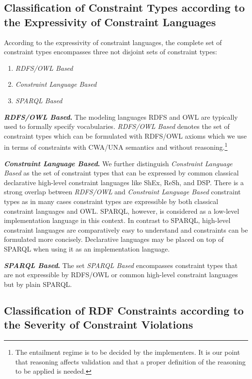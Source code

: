 \documentclass{llncs}
\begin{document}
\subsection{Classification of Constraint Types according to the Expressivity of Constraint Languages}

According to the expressivity of constraint languages, the complete set of constraint types encompasses three not disjoint sets of constraint types:
\begin{enumerate}
	\item \emph{RDFS/OWL Based}
	\item \emph{Constraint Language Based}
	\item \emph{SPARQL Based}
\end{enumerate}

\textbf{\emph{RDFS/OWL Based}.}
The modeling languages RDFS and OWL are typically used to formally specify vocabularies. \emph{RDFS/OWL Based} denotes the set of constraint types which can be formulated with RDFS/OWL axioms which we use in terms of constraints with CWA/UNA semantics and without reasoning.\footnote{The entailment regime is to be decided by the implementers. It is our point that reasoning affects validation and that a proper definition of the reasoning to be applied is needed.} 

\textbf{\emph{Constraint Language Based}.}
We further distinguish \emph{Constraint Language Based} as the set of constraint types that can be expressed by common classical declarative high-level constraint languages like ShEx, ReSh, and DSP. 
There is a strong overlap between \emph{RDFS/OWL} and \emph{Constraint Language Based} constraint types as in many cases constraint types are expressible by both classical constraint languages and OWL. SPARQL, however, is considered as a low-level implementation language in this context. In contrast to SPARQL, high-level constraint languages are comparatively easy to understand and constraints can be formulated more concisely. Declarative languages may be placed on top of SPARQL when using it as an implementation language. 

\textbf{\emph{SPARQL Based}.}
The set \emph{SPARQL Based} encompasses constraint types that are not expressible by RDFS/OWL or common high-level constraint languages but by plain SPARQL. 

\subsection{Classification of RDF Constraints according to the Severity of Constraint Violations}
\end{document}
